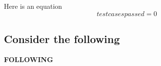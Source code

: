 Here is an equation
\begin{equation}
    testcases passed = 0
\end{equation}

\subsection{Consider the following}
    \textbf{FOLLOWING}